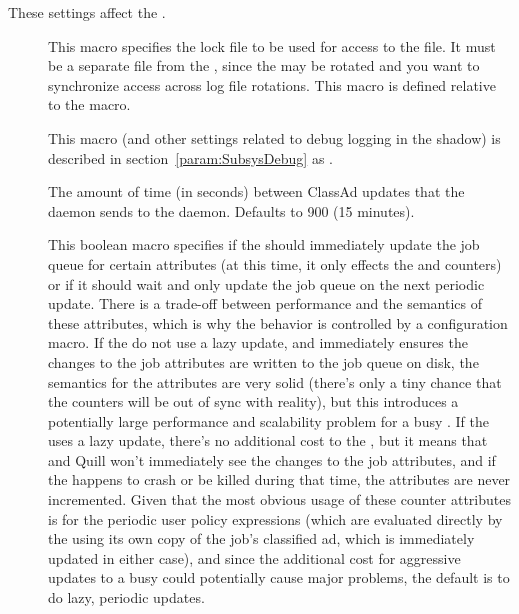 These settings affect the .
\begin{description}

\item[] \label{param:ShadowLock} This macro
  specifies the lock file to be used for access to the
   file.  It must be a separate file from the
  , since the  may be rotated 
  and you want to synchronize access across log file rotations.
  This macro is defined relative to the  macro.

\item[] \label{param:ShadowDebug} This macro
  (and other settings related to debug logging in the shadow) is
  described in section~\ref{param:SubsysDebug} as
  .

\item[]
\label{param:ShadowQueueUpdateInterval}
The amount of time (in seconds) between ClassAd updates that the
 daemon sends to the  daemon.
Defaults to 900 (15 minutes).

\item[]
\label{param:ShadowLazyQueueUpdate}
  This boolean macro specifies if the  should
  immediately update the job queue for certain attributes (at this
  time, it only effects the  and
   counters) or if it should wait and only
  update the job queue on the next periodic update.
  There is a trade-off between performance and the semantics of these
  attributes, which is why the behavior is controlled by a
  configuration macro.
  If the  do not use a lazy update, and immediately
  ensures the changes to the job attributes are written to the job
  queue on disk, the semantics for the attributes are very solid
  (there's only a tiny chance that the counters will be out of sync
  with reality), but this introduces a potentially large performance
  and scalability problem for a busy .
  If the  uses a lazy update, there's no additional cost
  to the , but it means that  and Quill won't
  immediately see the changes to the job attributes, and if the
   happens to crash or be killed during that time, the
  attributes are never incremented.
  Given that the most obvious usage of these counter attributes is for
  the periodic user policy expressions (which are evaluated directly
  by the  using its own copy of the job's classified
  ad, which is immediately updated in either case), and since the
  additional cost for aggressive updates to a busy 
  could potentially cause major problems, the default is 
  to do lazy, periodic updates.


\end{description}
